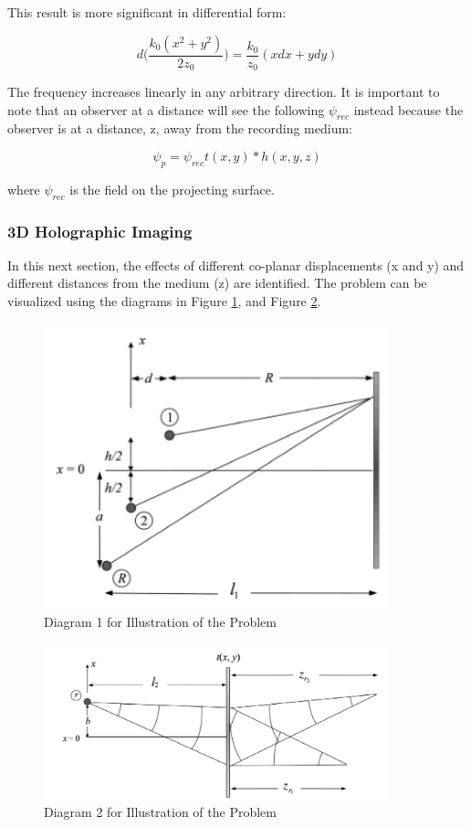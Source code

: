\documentclass[12pt]{article}
\begin{document}
This result is more significant in differential form:

\begin{equation}
	d \bigg( \frac{k_{0}(x^2 + y^2)}{2z_{0}} \bigg) = \frac{k_{0}}{z_{0}}(xdx + ydy)
\end{equation}

The frequency increases linearly in any arbitrary direction.
It is important to note that an observer at a distance will see the following
\(\psi_{rec}\) instead because the observer is at a distance, z, away from the
recording medium:

\begin{equation}
	\psi_{p} = \psi_{rec}t(x,y)*h(x,y,z)
\end{equation}

where \(\psi_{rec}\) is the field on the projecting surface.

\subsubsection{3D Holographic Imaging}

In this next section, the effects of different co-planar displacements (x and y) and different distances from the medium (z) are identified. The problem can be visualized using the diagrams in Figure \ref{fig:diagram1}, and Figure \ref{fig:diagram2}.

\begin{figure}
    \centering
    \includegraphics[width=100mm]{tupac11.png}
    \caption{Diagram 1 for Illustration of the Problem}
    \label{fig:diagram1}
\end{figure}


\begin{figure}
    \centering
    \includegraphics[width=100mm]{tupac12.png}
    \caption{Diagram 2 for Illustration of the Problem}
    \label{fig:diagram2}
\end{figure}
\end{document}
